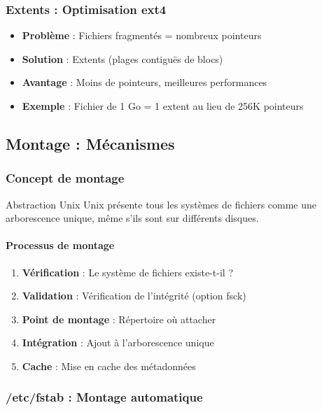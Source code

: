 \documentclass[12pt,a4paper]{article}
\begin{document}
\subsubsection{Extents : Optimisation ext4}

\begin{itemize}
    \item \textbf{Problème} : Fichiers fragmentés = nombreux pointeurs
    \item \textbf{Solution} : Extents (plages contiguës de blocs)
    \item \textbf{Avantage} : Moins de pointeurs, meilleures performances
    \item \textbf{Exemple} : Fichier de 1 Go = 1 extent au lieu de 256K pointeurs
\end{itemize}

\subsection{Montage : Mécanismes}

\subsubsection{Concept de montage}

\begin{infobox}{Abstraction Unix}
Unix présente tous les systèmes de fichiers comme une arborescence unique, même s'ils sont sur différents disques.
\end{infobox}

\paragraph{Processus de montage}
\begin{enumerate}
    \item \textbf{Vérification} : Le système de fichiers existe-t-il ?
    \item \textbf{Validation} : Vérification de l'intégrité (option fsck)
    \item \textbf{Point de montage} : Répertoire où attacher
    \item \textbf{Intégration} : Ajout à l'arborescence unique
    \item \textbf{Cache} : Mise en cache des métadonnées
\end{enumerate}

\subsubsection{/etc/fstab : Montage automatique}
\end{document}
